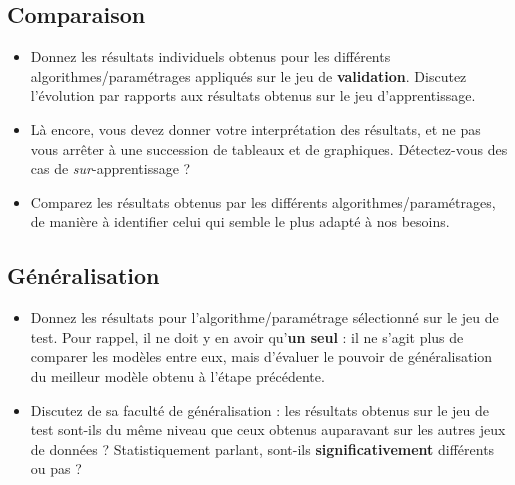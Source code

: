 \documentclass{ceri/sty/rapport}
\begin{document}
\subsection{Comparaison}
\begin{itemize}
	\item Donnez les résultats individuels obtenus pour les différents algorithmes/paramétrages appliqués sur le jeu de \textbf{validation}. Discutez l'évolution par rapports aux résultats obtenus sur le jeu d'apprentissage.
	\item Là encore, vous devez donner votre interprétation des résultats, et ne pas vous arrêter à une succession de tableaux et de graphiques. Détectez-vous des cas de \textit{sur}-apprentissage ?
	\item Comparez les résultats obtenus par les différents algorithmes/paramétrages, de manière à identifier celui qui semble le plus adapté à nos besoins.
\end{itemize}





\subsection{Généralisation}
\begin{itemize}
	\item Donnez les résultats pour l'algorithme/paramétrage sélectionné sur le jeu de test. Pour rappel, il ne doit y en avoir qu'\textbf{un seul} : il ne s'agit plus de comparer les modèles entre eux, mais d'évaluer le pouvoir de généralisation du meilleur modèle obtenu à l'étape précédente.
	\item Discutez de sa faculté de généralisation : les résultats obtenus sur le jeu de test sont-ils du même niveau que ceux obtenus auparavant sur les autres jeux de données ? Statistiquement parlant, sont-ils \textbf{significativement} différents ou pas ?
\end{itemize}





\end{document}
